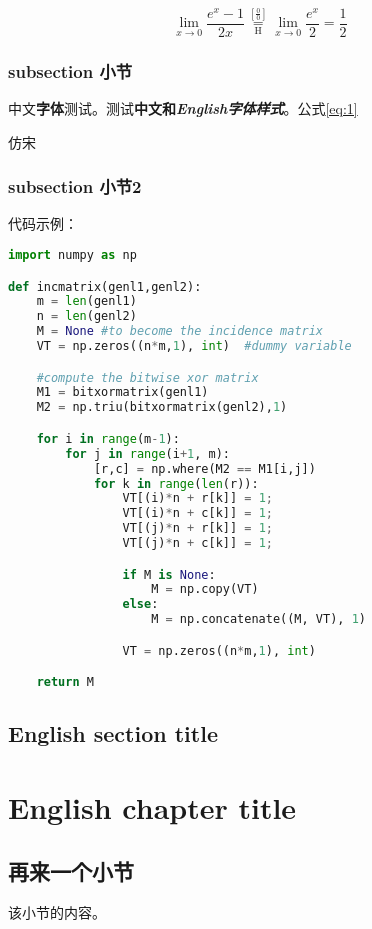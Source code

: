 \documentclass[a4paper,twoside]{ctexbook}
\begin{document}
\lipsum[3-5]

\begin{equation}
  \label{eq:1}
   \lim_{x\to 0}{\frac{e^x-1}{2x}}
   \overset{\left[\frac{0}{0}\right]}{\underset{\mathrm{H}}{=}}
   \lim_{x\to 0}{\frac{e^x}{2}}={\frac{1}{2}}
\end{equation}

\subsection{subsection 小节}

中文\textbf{字体}测试。测试\textbf{中文和\textit{English字体样式}}。公式\ref{eq:1}

{\fzfs 仿宋}

\subsection{subsection 小节2}

代码示例：

\begin{lstlisting}[language=Python,caption={Python example}]
import numpy as np

def incmatrix(genl1,genl2):
    m = len(genl1)
    n = len(genl2)
    M = None #to become the incidence matrix
    VT = np.zeros((n*m,1), int)  #dummy variable

    #compute the bitwise xor matrix
    M1 = bitxormatrix(genl1)
    M2 = np.triu(bitxormatrix(genl2),1)

    for i in range(m-1):
        for j in range(i+1, m):
            [r,c] = np.where(M2 == M1[i,j])
            for k in range(len(r)):
                VT[(i)*n + r[k]] = 1;
                VT[(i)*n + c[k]] = 1;
                VT[(j)*n + r[k]] = 1;
                VT[(j)*n + c[k]] = 1;

                if M is None:
                    M = np.copy(VT)
                else:
                    M = np.concatenate((M, VT), 1)

                VT = np.zeros((n*m,1), int)

    return M
\end{lstlisting}


\section{English section title}

\lipsum[2-5]

\chapter{English chapter title}

\hspace{.15\linewidth}\begin{minipage}[H]{.7\linewidth}
{
  \hypersetup{hidelinks}
  \startcontents[chapters]
}
\end{minipage}
\vspace{10ex}

\lipsum[3]

\clearpage

\section{再来一个小节}

该小节的内容。
\end{document}
